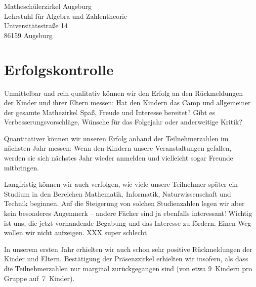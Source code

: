 \documentclass[12pt]{zettel}
\begin{document}
\begin{tabbing}
  Matheschülerzirkel Augsburg \\
  Lehrstuhl für Algebra und Zahlentheorie \\
  Universitätsstraße 14 \\
  86159 Augsburg
\end{tabbing}


\section{Erfolgskontrolle}

Unmittelbar und rein qualitativ können wir den Erfolg an den Rückmeldungen der
Kinder und ihrer Eltern messen: Hat den Kindern das Camp und allgemeiner der
gesamte Mathezirkel Spaß, Freude und Interesse bereitet? Gibt es
Verbesserungsvorschläge, Wünsche für das Folgejahr oder anderweitige Kritik?

Quantitativer können wir unseren Erfolg anhand der Teilnehmerzahlen im nächsten
Jahr messen: Wenn den Kindern unsere Veranstaltungen gefallen, werden sie sich
nächstes Jahr wieder anmelden und vielleicht sogar Freunde mitbringen.

Langfristig können wir auch verfolgen, wie viele unsere Teilnehmer später ein
Studium in den Bereichen Mathematik, Informatik, Naturwissenschaft und Technik
beginnen. Auf die Steigerung von solchen Studienzahlen legen wir aber kein
besonderes Augenmerk -- andere Fächer sind ja ebenfalls interessant! Wichtig
ist uns, die jetzt vorhandende Begabung und das Interesse zu fördern. Einen Weg
wollen wir nicht aufzeigen. XXX super schlecht

In unserem ersten Jahr erhielten wir auch schon sehr positive Rückmeldungen der
Kinder und Eltern. Bestätigung der Präsenzzirkel erhielten wir insofern, als
dass die Teilnehmerzahlen nur marginal zurückgegangen sind (von etwa 9~Kindern
pro Gruppe auf~7~Kinder).
\end{document}
